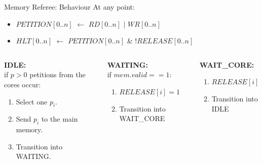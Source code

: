 \begin{frame}{Memory Referee: Behaviour}
  At any point:
  \begin{itemize}
      \item $PETITION[0..n]$ $\longleftarrow$ $RD[0..n]$ \hspace{0.2cm}$\mid$\hspace{0.2cm} $WR[0..n]$
      
      
      \item $HLT[0..n]$ $\longleftarrow$  $PETITION[0..n]$ \hspace{0.2cm}\&\hspace{0.2cm} $!RELEASE[0..n]$
  \end{itemize}
  
  \begin{columns}[T]
    \begin{column}{0.33\textwidth}
      \textbf{IDLE:}\\
      if $p>0$ petitions from the cores occur:
      \begin{enumerate}
          \item Select one $p_i$.
          \item Send $p_i$ to the main memory.
          \item Transition into WAITING.
      \end{enumerate}
    \end{column}
    \begin{column}{0.33\textwidth}
      \textbf{WAITING:}\\
      if $mem.valid==1$:
      \begin{enumerate}
          \item $RELEASE[i]=1$
          \item Transition into WAIT\_CORE
      \end{enumerate}
    \end{column}
    \begin{column}{0.33\textwidth}
      \textbf{WAIT\_CORE:}\\
      \begin{enumerate}
          \item $RELEASE[i]=0$
          \item Transition into IDLE
      \end{enumerate}
    \end{column}
  \end{columns}
\end{frame}

